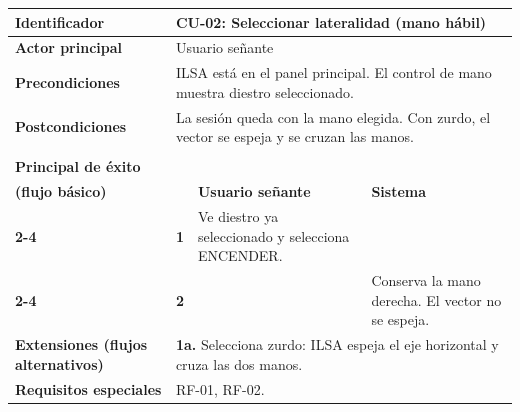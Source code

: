 \begin{table}[h!]
\centering
\renewcommand{\arraystretch}{1.35}
\begin{tabularx}{\textwidth}{|>{\raggedright\arraybackslash\bfseries}p{4cm}|p{0.5cm}|X|X|}
\hline
Identificador & \multicolumn{3}{p{\dimexpr\textwidth-4.5cm-4\tabcolsep\relax}|}{\textbf{CU-02: Seleccionar lateralidad (mano hábil)}} \\ \hline
Actor principal & \multicolumn{3}{p{\dimexpr\textwidth-4.5cm-4\tabcolsep\relax}|}{Usuario señante} \\ \hline
Precondiciones & \multicolumn{3}{p{\dimexpr\textwidth-4.5cm-4\tabcolsep\relax}|}{ILSA está en el panel principal. El control de mano muestra diestro seleccionado.} \\ \hline
Postcondiciones & \multicolumn{3}{p{\dimexpr\textwidth-4.5cm-4\tabcolsep\relax}|}{La sesión queda con la mano elegida. Con zurdo, el vector se espeja y se cruzan las manos.} \\ \hline
\multirow{3}{4cm}{Escenario\\ Principal de éxito\\ (flujo básico)}
 & & \textbf{Usuario señante} & \textbf{Sistema} \\ \cline{2-4}
 & \textbf{1} & Ve diestro ya seleccionado y selecciona ENCENDER. & \\ \cline{2-4}
 & \textbf{2} & & Conserva la mano derecha. El vector no se espeja. \\ \hline
Extensiones (flujos alternativos) & \multicolumn{3}{p{\dimexpr\textwidth-4.5cm-4\tabcolsep\relax}|}{\textbf{1a.} Selecciona zurdo: ILSA espeja el eje horizontal y cruza las dos manos.} \\ \hline
Requisitos especiales & \multicolumn{3}{p{\dimexpr\textwidth-4.5cm-4\tabcolsep\relax}|}{RF-01, RF-02.} \\ \hline
\end{tabularx}
\end{table}

